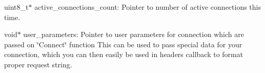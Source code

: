 uint8\+\_\+t$\ast$ active\+\_\+connections\+\_\+count\+: Pointer to number of active connections this time.
\begin{DoxyItemize}
\item void$\ast$ user\+\_\+parameters\+: Pointer to user parameters for connection which are passed on \char`\"{}\+Connect\char`\"{} function This can be used to pass special data for your connection, which you can then easily be used in headers callback to format proper request string. 
\end{DoxyItemize}